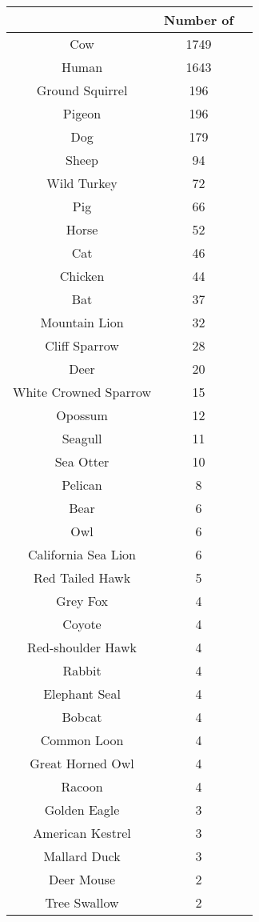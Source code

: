 \begin{tabular}{c|c|c}
\Spec{} & Number of \Isols{} \\ \hline \hline 
Cow & 1749 \\ \hline
Human & 1643 \\ \hline
Ground Squirrel & 196 \\ \hline
Pigeon & 196 \\ \hline
Dog & 179 \\ \hline
Sheep & 94 \\ \hline
Wild Turkey & 72 \\ \hline
Pig & 66 \\ \hline
Horse & 52 \\ \hline
Cat & 46 \\ \hline
Chicken & 44 \\ \hline
Bat & 37 \\ \hline
Mountain Lion & 32 \\ \hline
Cliff Sparrow & 28 \\ \hline
Deer & 20 \\ \hline
White Crowned Sparrow & 15 \\ \hline
Opossum & 12 \\ \hline
Seagull & 11 \\ \hline
Sea Otter & 10 \\ \hline
Pelican & 8 \\ \hline
Bear & 6 \\ \hline
Owl & 6 \\ \hline
California Sea Lion & 6 \\ \hline
Red Tailed Hawk & 5 \\ \hline
Grey Fox & 4 \\ \hline
Coyote & 4 \\ \hline
Red-shoulder Hawk & 4 \\ \hline
Rabbit & 4 \\ \hline
Elephant Seal & 4 \\ \hline
Bobcat & 4 \\ \hline
Common Loon & 4 \\ \hline
Great Horned Owl & 4 \\ \hline
Racoon & 4 \\ \hline
Golden Eagle & 3 \\ \hline
American Kestrel & 3 \\ \hline
Mallard Duck & 3 \\ \hline
Deer Mouse & 2 \\ \hline
Tree Swallow & 2 \\ \hline

\end{tabular}
